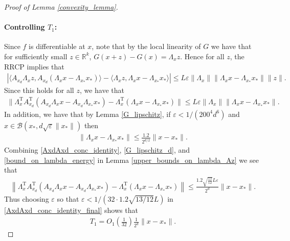 \documentclass[11pt]{article}
\renewcommand{\epsilon}{\varepsilon}
\newcommand{\R}{\mathbb{R}}
\newcommand{\G}{G}
\renewcommand{\top}{{\mathrm{T}}}
\theoremstyle{remark}
\begin{document}
\begin{proof}[Proof of Lemma \ref{convexity_lemma}]
\paragraph{Controlling $T_1$:} Since $f$ is differentiable at $x$, note that by the local linearity of $\G$ we have that for sufficiently small $z \in \R^k$, $\G(x+z) - \G(x) = \Lambda_x z$. Hence for all $z$, the RRCP implies that \begin{align*}
    |\langle A_{x_d}\Lambda_x z,A_{x_d}(\Lambda_x x - \Lambda_{x_*}x_*)\rangle - \langle \Lambda_x z,\Lambda_x x - \Lambda_{x_*}x_*\rangle| \leqslant L\epsilon \|\Lambda_x\|\|\Lambda_x x - \Lambda_{x_*}x_*\|\|z\|.
\end{align*} Since this holds for all $z$, we have that \begin{align}
    \|\Lambda_x^\top A_{x_d}^\top (A_{x_d}\Lambda_x x - A_{x_{d}}\Lambda_{x_*}x_*) - \Lambda_x^\top(\Lambda_x x - \Lambda_{x_*} x_*)\| \leqslant L\epsilon \|\Lambda_x\|\|\Lambda_x x - \Lambda_{x_*}x_*\|. \label{AxdAxd_conc_identity}
\end{align}In addition, we have that by Lemma \ref{G_lipschitz}, if $\epsilon < 1/(200^4d^6)$ and $x \in \mathcal{B}(x_*, d\sqrt{\epsilon}\|x_*\|)$ then \begin{align}
    \|\Lambda_x x - \Lambda_{x_*}x_*\| \leqslant \frac{1.2}{2^{d/2}}\|x-x_*\|. \label{G_lipschitz_d}
\end{align}  Combining \eqref{AxdAxd_conc_identity}, \eqref{G_lipschitz_d}, and \eqref{bound_on_lambda_energy} in Lemma \ref{upper_bounds_on_lambda_Az} we see that \begin{align}
      \left\|\Lambda_x^\top A_{x_d}^\top (A_{x_d}\Lambda_x x - A_{x_{d}}\Lambda_{x_*}x_*) - \Lambda_x^\top(\Lambda_x x - \Lambda_{x_*} x_*)\right\| \leqslant \frac{1.2\sqrt{\frac{13}{12}}L\epsilon}{2^d}\|x - x_*\|. \label{AxdAxd_conc_identity_final}
\end{align} Thus choosing $\epsilon$ so that $\epsilon < 1/(32\cdot1.2\sqrt{13/12}L)$ in \eqref{AxdAxd_conc_identity_final} shows that \begin{align}
    T_1 = O_1\left(\frac{1}{32}\right)\frac{1}{2^d}\|x-x_*\|. \label{T1_bound}
\end{align}%

\end{proof}
\end{document}
